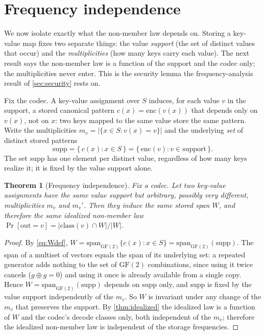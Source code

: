 \documentclass[11pt]{article}
\theoremstyle{definition}
\theoremstyle{plain}
\newtheorem{theorem}{Theorem}[section]
\theoremstyle{remark}
\newcommand{\enc}{\mathrm{enc}}
\newcommand{\GF}{\mathrm{GF}(2)}
\newcommand{\spn}{\mathrm{span}}
\newcommand{\class}{\mathrm{class}}
\newcommand{\W}{W}                          %
\newcommand{\supp}{\mathrm{supp}}           %
\newcommand{\cx}{c(x)}                      %
\newcommand{\inter}{\cap}
\begin{document}
\section{Frequency independence}
\label{sec:t3}

We now isolate exactly what the non-member law depends on. Storing a key-value map
fixes two separate things: the value \emph{support} (the set of distinct values that
occur) and the \emph{multiplicities} (how many keys carry each value). The next result
says the non-member law is a function of the support and the codec only; the
multiplicities never enter. This is the security lemma the frequency-analysis result
of \cref{sec:security} rests on.

Fix the codec. A key-value assignment over $S$ induces, for each value $v$ in the
support, a stored canonical pattern $\cx = \enc(v(x))$ that depends only on $v(x)$,
not on $x$: two keys mapped to the same value store the same pattern. Write the
multiplicities $m_v = |\{x \in S : v(x) = v\}|$ and the underlying \emph{set} of
distinct stored patterns
\[
  \supp = \{\, \cx : x \in S \,\} = \{\, \enc(v) : v \in \text{support} \,\}.
\]
The set $\supp$ has one element per distinct value, regardless of how many keys
realize it; it is fixed by the value support alone.

\begin{theorem}[Frequency independence]
\label{thm:freqindep}
Fix a codec. Let two key-value assignments have the same value support but arbitrary,
possibly very different, multiplicities $m_v$ and $m_v'$. Then they induce the same
stored span $\W$, and therefore the same idealized non-member law
$\Pr[\mathrm{out} = v] = |\class(v) \inter \W| / |\W|$.
\end{theorem}

\begin{proof}
By \eqref{eq:Wdef}, $\W = \spn_{\GF}\{\cx : x \in S\} = \spn_{\GF}(\supp)$. The span of
a multiset of vectors equals the span of its underlying set: a repeated generator adds
nothing to the set of $\GF$ combinations, since using it twice cancels
($g \oplus g = 0$) and using it once is already available from a single copy. Hence
$\W = \spn_{\GF}(\supp)$ depends on $\supp$ only, and $\supp$ is fixed by the value
support independently of the $m_v$. So $\W$ is invariant under any change of the $m_v$
that preserves the support. By \cref{thm:idealized} the idealized law is a function of
$\W$ and the codec's decode classes only, both independent of the $m_v$; therefore the
idealized non-member law is independent of the storage frequencies.
\end{proof}
\end{document}

